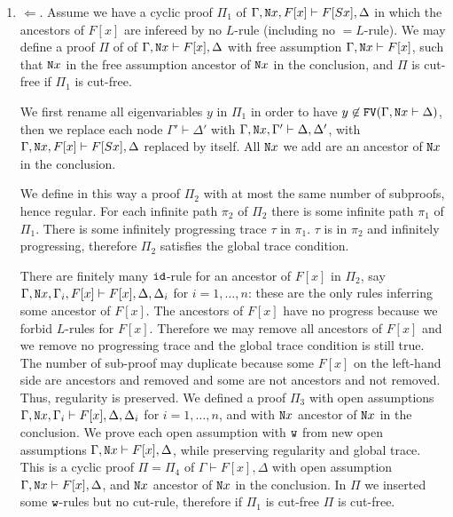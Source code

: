 \documentclass[a4paper,12pt]{article}
\newenvironment{proof}[1][Proof]{\begin{trivlist}
\item[\hskip \labelsep {\bfseries #1}]}{\end{trivlist}}
\newcommand{\Nat}               { {\tt N}  }
\newcommand{\FV}              { {\tt FV} }
\newcommand{\id}              { {\tt id} }
\newcommand{\eqL}     {= \! \!  \!  L}
\newcommand{\Weak} { {\tt w} }
\begin{document}
\begin{proof}
\begin{enumerate}
\item
$\Leftarrow$. Assume we have a cyclic proof $\Pi_1$ of  $\Gamma, \Nat x, F[x] \vdash F[Sx], \Delta$ in which the ancestors of $F[x]$ are infereed by no $L$-rule (including no $\eqL$-rule). We may define a proof $\Pi$ of of  $\Gamma, \Nat x \vdash F[x], \Delta$ with free assumption $\Gamma, \Nat x \vdash F[x]$, such that $\Nat x$ in the free assumption ancestor of $\Nat x$ in the conclusion, and $\Pi$ is cut-free if $\Pi_1$ is cut-free. 

We first rename all eigenvariables $y$ in $\Pi_1$ in order to have $y \not \in \FV(\Gamma, \Nat x \vdash \Delta)$, then we replace each node $\Gamma' \vdash \Delta'$ with $\Gamma, \Nat x, \Gamma' \vdash \Delta, \Delta'$, with $\Gamma, \Nat x, F[x] \vdash F[Sx], \Delta$ replaced by itself. All $\Nat x$ we add are an ancestor of $\Nat x$ in the conclusion.


We define in this way a proof $\Pi_2$ with at most the same number of subproofs, hence regular. For each infinite path $\pi_2$ of $\Pi_2$ there is some infinite path $\pi_1$ of $\Pi_1$. There is some infinitely progressing trace $\tau$ in $\pi_1$. $\tau$ is in $\pi_2$ and infinitely progressing, therefore $\Pi_2$ satisfies the global trace condition.

There are finitely many $\id$-rule for an ancestor of $F[x]$ in $\Pi_2$, say $\Gamma, \Nat x, \Gamma_i, F[x] \vdash F[x], \Delta, \Delta_i$ for $i=1, \ldots, n$: these are the only rules inferring some ancestor of $F[x]$. The ancestors of $F[x]$ have no progress because we forbid $L$-rules for $F[x]$. Therefore we may remove all ancestors of $F[x]$ and we remove no progressing trace and the global trace condition is still true. The number of sub-proof may duplicate because some $F[x]$ on the left-hand side are ancestors and removed and some are not ancestors and not removed. Thus, regularity is preserved. We defined a proof $\Pi_3$ with open assumptions $\Gamma, \Nat x, \Gamma_i \vdash F[x], \Delta, \Delta_i$ for $i=1, \ldots, n$, and with $\Nat x$ ancestor of $\Nat x$ in the conclusion. We prove each open assumption with $\Weak$ from new open assumptions $\Gamma, \Nat x \vdash F[x], \Delta$, while preserving regularity and global trace. This is a cyclic proof $\Pi = \Pi_4$ of $\Gamma \vdash F[x], \Delta$ with open assumption $\Gamma, \Nat x \vdash F[x], \Delta$, and $\Nat x$ ancestor of $\Nat x$ in the conclusion. In $\Pi$ we inserted some $\Weak$-rules but no cut-rule, therefore if $\Pi_1$ is cut-free $\Pi$ is cut-free.


\end{enumerate}
\end{proof}
\end{document}
